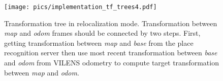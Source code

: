 \begin{figure}[htbp]
  \centering
  \texttt{[image: pics/implementation\_tf\_trees4.pdf]}
  \caption{Transformation tree in relocalization mode. Transformation between \emph{map} and \emph{odom} frames should be connected by two steps. First, getting transformation between \emph{map} and \emph{base} from the place recognition server then use most recent transformation between \emph{base} and \emph{odom} from VILENS odometry to compute target transformation between \emph{map} and \emph{odom}.}  
  \label{fig:implementation_relocalization_tf}
\end{figure}